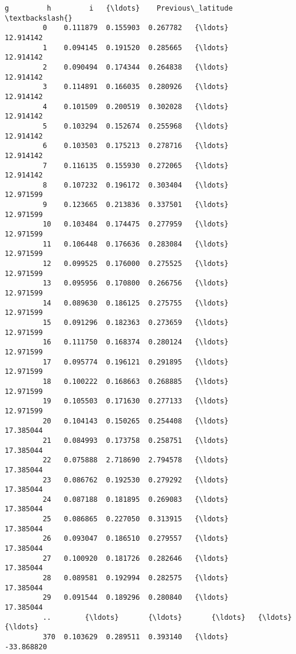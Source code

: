 \documentclass[11pt]{article}
\begin{document}
\begin{Verbatim}[commandchars=\\\{\}]
                     g         h         i   {\ldots}    Previous\_latitude  \textbackslash{}
         0    0.111879  0.155903  0.267782   {\ldots}            12.914142   
         1    0.094145  0.191520  0.285665   {\ldots}            12.914142   
         2    0.090494  0.174344  0.264838   {\ldots}            12.914142   
         3    0.114891  0.166035  0.280926   {\ldots}            12.914142   
         4    0.101509  0.200519  0.302028   {\ldots}            12.914142   
         5    0.103294  0.152674  0.255968   {\ldots}            12.914142   
         6    0.103503  0.175213  0.278716   {\ldots}            12.914142   
         7    0.116135  0.155930  0.272065   {\ldots}            12.914142   
         8    0.107232  0.196172  0.303404   {\ldots}            12.971599   
         9    0.123665  0.213836  0.337501   {\ldots}            12.971599   
         10   0.103484  0.174475  0.277959   {\ldots}            12.971599   
         11   0.106448  0.176636  0.283084   {\ldots}            12.971599   
         12   0.099525  0.176000  0.275525   {\ldots}            12.971599   
         13   0.095956  0.170800  0.266756   {\ldots}            12.971599   
         14   0.089630  0.186125  0.275755   {\ldots}            12.971599   
         15   0.091296  0.182363  0.273659   {\ldots}            12.971599   
         16   0.111750  0.168374  0.280124   {\ldots}            12.971599   
         17   0.095774  0.196121  0.291895   {\ldots}            12.971599   
         18   0.100222  0.168663  0.268885   {\ldots}            12.971599   
         19   0.105503  0.171630  0.277133   {\ldots}            12.971599   
         20   0.104143  0.150265  0.254408   {\ldots}            17.385044   
         21   0.084993  0.173758  0.258751   {\ldots}            17.385044   
         22   0.075888  2.718690  2.794578   {\ldots}            17.385044   
         23   0.086762  0.192530  0.279292   {\ldots}            17.385044   
         24   0.087188  0.181895  0.269083   {\ldots}            17.385044   
         25   0.086865  0.227050  0.313915   {\ldots}            17.385044   
         26   0.093047  0.186510  0.279557   {\ldots}            17.385044   
         27   0.100920  0.181726  0.282646   {\ldots}            17.385044   
         28   0.089581  0.192994  0.282575   {\ldots}            17.385044   
         29   0.091544  0.189296  0.280840   {\ldots}            17.385044   
         ..        {\ldots}       {\ldots}       {\ldots}   {\ldots}                  {\ldots}   
         370  0.103629  0.289511  0.393140   {\ldots}           -33.868820   

\end{Verbatim}
\end{document}
